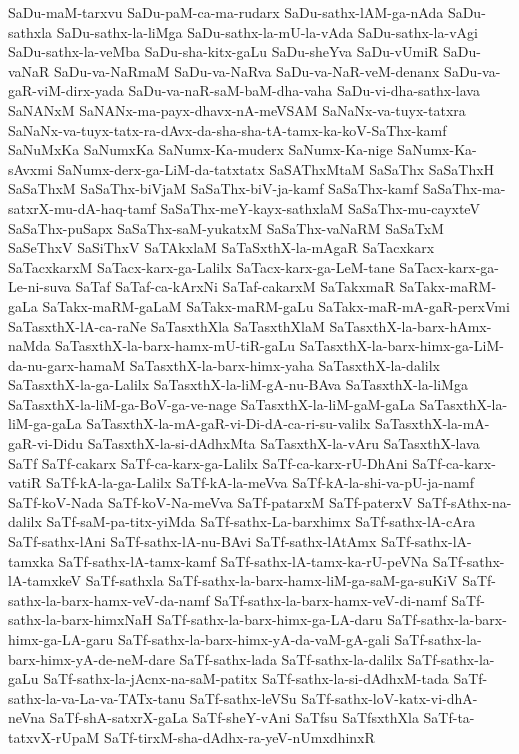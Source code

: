 {SaDu-maM-tarxvu
SaDu-paM-ca-ma-rudarx
SaDu-sathx-lAM-ga-nAda
SaDu-sathxla
SaDu-sathx-la-liMga
SaDu-sathx-la-mU-la-vAda
SaDu-sathx-la-vAgi
SaDu-sathx-la-veMba
SaDu-sha-kitx-gaLu
SaDu-sheYva
SaDu-vUmiR
SaDu-vaNaR
SaDu-va-NaRmaM
SaDu-va-NaRva
SaDu-va-NaR-veM-denanx
SaDu-va-gaR-viM-dirx-yada
SaDu-va-naR-saM-baM-dha-vaha
SaDu-vi-dha-sathx-lava
SaNANxM
SaNANx-ma-payx-dhavx-nA-meVSAM
SaNaNx-va-tuyx-tatxra
SaNaNx-va-tuyx-tatx-ra-dAvx-da-sha-sha-tA-tamx-ka-koV-SaThx-kamf
SaNuMxKa
SaNumxKa
SaNumx-Ka-muderx
SaNumx-Ka-nige
SaNumx-Ka-sAvxmi
SaNumx-derx-ga-LiM-da-tatxtatx
SaSAThxMtaM
SaSaThx
SaSaThxH
SaSaThxM
SaSaThx-biVjaM
SaSaThx-biV-ja-kamf
SaSaThx-kamf
SaSaThx-ma-satxrX-mu-dA-haq-tamf
SaSaThx-meY-kayx-sathxlaM
SaSaThx-mu-cayxteV
SaSaThx-puSapx
SaSaThx-saM-yukatxM
SaSaThx-vaNaRM
SaSaTxM
SaSeThxV
SaSiThxV
SaTAkxlaM
SaTaSxthX-la-mAgaR
SaTacxkarx
SaTacxkarxM
SaTacx-karx-ga-Lalilx
SaTacx-karx-ga-LeM-tane
SaTacx-karx-ga-Le-ni-suva
SaTaf
SaTaf-ca-kArxNi
SaTaf-cakarxM
SaTakxmaR
SaTakx-maRM-gaLa
SaTakx-maRM-gaLaM
SaTakx-maRM-gaLu
SaTakx-maR-mA-gaR-perxVmi
SaTasxthX-lA-ca-raNe
SaTasxthXla
SaTasxthXlaM
SaTasxthX-la-barx-hAmx-naMda
SaTasxthX-la-barx-hamx-mU-tiR-gaLu
SaTasxthX-la-barx-himx-ga-LiM-da-nu-garx-hamaM
SaTasxthX-la-barx-himx-yaha
SaTasxthX-la-dalilx
SaTasxthX-la-ga-Lalilx
SaTasxthX-la-liM-gA-nu-BAva
SaTasxthX-la-liMga
SaTasxthX-la-liM-ga-BoV-ga-ve-nage
SaTasxthX-la-liM-gaM-gaLa
SaTasxthX-la-liM-ga-gaLa
SaTasxthX-la-mA-gaR-vi-Di-dA-ca-ri-su-valilx
SaTasxthX-la-mA-gaR-vi-Didu
SaTasxthX-la-si-dAdhxMta
SaTasxthX-la-vAru
SaTasxthX-lava
SaTf
SaTf-cakarx
SaTf-ca-karx-ga-Lalilx
SaTf-ca-karx-rU-DhAni
SaTf-ca-karx-vatiR
SaTf-kA-la-ga-Lalilx
SaTf-kA-la-meVva
SaTf-kA-la-shi-va-pU-ja-namf
SaTf-koV-Nada
SaTf-koV-Na-meVva
SaTf-patarxM
SaTf-paterxV
SaTf-sAthx-na-dalilx
SaTf-saM-pa-titx-yiMda
SaTf-sathx-La-barxhimx
SaTf-sathx-lA-cAra
SaTf-sathx-lAni
SaTf-sathx-lA-nu-BAvi
SaTf-sathx-lAtAmx
SaTf-sathx-lA-tamxka
SaTf-sathx-lA-tamx-kamf
SaTf-sathx-lA-tamx-ka-rU-peVNa
SaTf-sathx-lA-tamxkeV
SaTf-sathxla
SaTf-sathx-la-barx-hamx-liM-ga-saM-ga-suKiV
SaTf-sathx-la-barx-hamx-veV-da-namf
SaTf-sathx-la-barx-hamx-veV-di-namf
SaTf-sathx-la-barx-himxNaH
SaTf-sathx-la-barx-himx-ga-LA-daru
SaTf-sathx-la-barx-himx-ga-LA-garu
SaTf-sathx-la-barx-himx-yA-da-vaM-gA-gali
SaTf-sathx-la-barx-himx-yA-de-neM-dare
SaTf-sathx-lada
SaTf-sathx-la-dalilx
SaTf-sathx-la-gaLu
SaTf-sathx-la-jAcnx-na-saM-patitx
SaTf-sathx-la-si-dAdhxM-tada
SaTf-sathx-la-va-La-va-TATx-tanu
SaTf-sathx-leVSu
SaTf-sathx-loV-katx-vi-dhA-neVna
SaTf-shA-satxrX-gaLa
SaTf-sheY-vAni
SaTfsu
SaTfsxthXla
SaTf-ta-tatxvX-rUpaM
SaTf-tirxM-sha-dAdhx-ra-yeV-nUmxdhinxR
}
